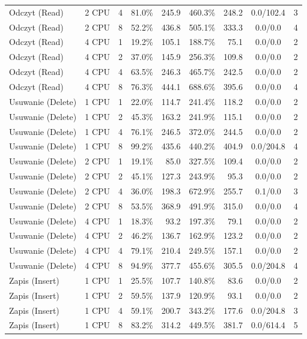 \begin{table}[ht]
{\begin{tabular}{llcrrrrcc}
Odczyt (Read) & 2 CPU & 4 & 81.0\% & 245.9 & 460.3\% & 248.2 & 0.0/102.4 & 3 \\
Odczyt (Read) & 2 CPU & 8 & 52.2\% & 436.8 & 505.1\% & 333.3 & 0.0/0.0 & 4 \\
Odczyt (Read) & 4 CPU & 1 & 19.2\% & 105.1 & 188.7\% & 75.1 & 0.0/0.0 & 2 \\
Odczyt (Read) & 4 CPU & 2 & 37.0\% & 145.9 & 256.3\% & 109.8 & 0.0/0.0 & 2 \\
Odczyt (Read) & 4 CPU & 4 & 63.5\% & 246.3 & 465.7\% & 242.5 & 0.0/0.0 & 2 \\
Odczyt (Read) & 4 CPU & 8 & 76.3\% & 444.1 & 688.6\% & 395.6 & 0.0/0.0 & 4 \\
Usuwanie (Delete) & 1 CPU & 1 & 22.0\% & 114.7 & 241.4\% & 118.2 & 0.0/0.0 & 2 \\
Usuwanie (Delete) & 1 CPU & 2 & 45.3\% & 163.2 & 241.9\% & 115.1 & 0.0/0.0 & 2 \\
Usuwanie (Delete) & 1 CPU & 4 & 76.1\% & 246.5 & 372.0\% & 244.5 & 0.0/0.0 & 2 \\
Usuwanie (Delete) & 1 CPU & 8 & 99.2\% & 435.6 & 440.2\% & 404.9 & 0.0/204.8 & 4 \\
Usuwanie (Delete) & 2 CPU & 1 & 19.1\% & 85.0 & 327.5\% & 109.4 & 0.0/0.0 & 2 \\
Usuwanie (Delete) & 2 CPU & 2 & 45.1\% & 127.3 & 243.9\% & 95.3 & 0.0/0.0 & 2 \\
Usuwanie (Delete) & 2 CPU & 4 & 36.0\% & 198.3 & 672.9\% & 255.7 & 0.1/0.0 & 3 \\
Usuwanie (Delete) & 2 CPU & 8 & 53.5\% & 368.9 & 491.9\% & 315.0 & 0.0/0.0 & 4 \\
Usuwanie (Delete) & 4 CPU & 1 & 18.3\% & 93.2 & 197.3\% & 79.1 & 0.0/0.0 & 2 \\
Usuwanie (Delete) & 4 CPU & 2 & 46.2\% & 136.7 & 162.9\% & 123.2 & 0.0/0.0 & 2 \\
Usuwanie (Delete) & 4 CPU & 4 & 79.1\% & 210.4 & 249.5\% & 157.1 & 0.0/0.0 & 2 \\
Usuwanie (Delete) & 4 CPU & 8 & 94.9\% & 377.7 & 455.6\% & 305.5 & 0.0/204.8 & 4 \\
Zapis (Insert) & 1 CPU & 1 & 25.5\% & 107.7 & 140.8\% & 83.6 & 0.0/0.0 & 2 \\
Zapis (Insert) & 1 CPU & 2 & 59.5\% & 137.9 & 120.9\% & 93.1 & 0.0/0.0 & 2 \\
Zapis (Insert) & 1 CPU & 4 & 59.1\% & 200.7 & 343.2\% & 177.6 & 0.0/204.8 & 3 \\
Zapis (Insert) & 1 CPU & 8 & 83.2\% & 314.2 & 449.5\% & 381.7 & 0.0/614.4 & 5 \\

\end{tabular}}
\end{table}
